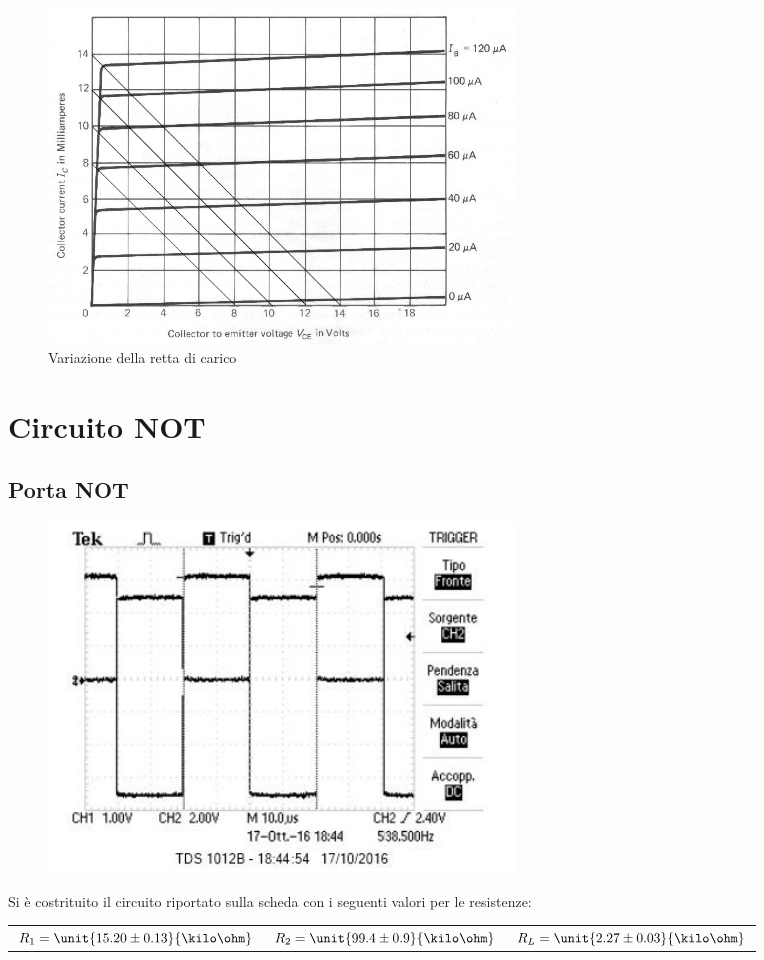 \documentclass[10pt,a4paper]{article}
\begin{document}
\begin{figure}[h!]
	\centering
	\includegraphics[width=0.6\textwidth]{../grafici/spostamento_retta.jpg}
	\caption{Variazione della retta di carico}
	\label{retta_spostamento}
\end{figure}

\section{Circuito NOT}

\subsection{Porta NOT}
\begin{figure}[h!]
	\centering
	\includegraphics[width=0.6\textwidth]{../oscilloscopio/not_tarocco.jpg}
	\caption{}
\end{figure}
Si è costrituito il circuito riportato sulla scheda con i seguenti valori per le resistenze:

\begin{table}[h!]
\centering
\begin{tabular}{c|c|c}
$R_1 = \unit{15.20 \pm 0.13}{\kilo\ohm}$ & $R_2 = \unit{99.4 \pm 0.9}{\kilo\ohm}$ & $R_L = \unit{2.27 \pm 0.03}{\kilo\ohm}$
\end{tabular}
\end{table}
\end{document}
